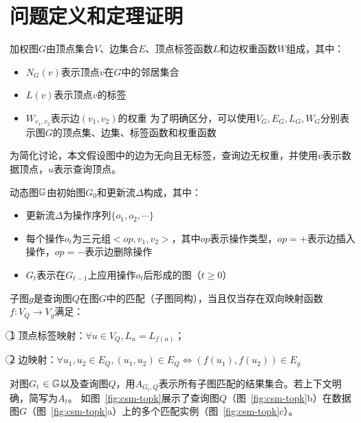 \section{问题定义和定理证明}
\label{ch3:definition}
\begin{definition}[加权图]
    加权图$G$由顶点集合$V$、边集合$E$、顶点标签函数$L$和边权重函数$W$组成，其中：

    \begin{itemize}
    \item $N_G(v)$表示顶点$v$在$G$中的邻居集合
    \item $L(v)$表示顶点$v$的标签
    \item $W_{v_1, v_2}$表示边$(v_1, v_2)$的权重
    为了明确区分，可以使用$V_G, E_G, L_G, W_G$分别表示图$G$的顶点集、边集、标签函数和权重函数
    \end{itemize}  
    \end{definition}
    
    为简化讨论，本文假设图中的边为无向且无标签，查询边无权重，并使用$v$表示数据顶点，$u$表示查询顶点。
    
    \begin{definition}[动态图]\label{def:dynamic-graph}
    动态图$\mathbb{G}$由初始图$G_0$和更新流$\Delta$构成，其中：

    \begin{itemize}
    \item 更新流$\Delta$为操作序列$\{o_1, o_2, \cdots\}$
    \item 每个操作$o_t$为三元组$<op, v_1, v_2>$，其中$op$表示操作类型，$op=+$表示边插入操作，$op=-$表示边删除操作
    \item  $G_t$表示在$G_{t-1}$上应用操作$o_t$后形成的图（$t \geq 0$）    
    \end{itemize} 
    \end{definition}
    
    \begin{definition}[子图匹配]\label{def:subgraph-matching}
    子图$g$是查询图$Q$在图$G$中的匹配（子图同构），当且仅当存在双向映射函数$f: V_Q \rightarrow V_g$满足：
    
    \textcircled{1} 顶点标签映射：$\forall u \in V_Q, L_u = L_{f(u)}$；
    
    \textcircled{2} 边映射：$\forall u_1, u_2\in E_Q, (u_1, u_2) \in E_Q \Leftrightarrow (f(u_1), f(u_2)) \in E_g$
    \end{definition}
    
    对图$G_t$ $\in\mathbb{G}$以及查询图$Q$，用$A_{G_t,Q}$表示所有子图匹配的结果集合。若上下文明确，简写为$A_t$。
    如图~\ref{fig:csm-topk}展示了查询图$Q$（图~\ref{fig:csm-topk}b）在数据图$G$（图~\ref{fig:csm-topk}a）上的多个匹配实例（图~\ref{fig:csm-topk}c）。
    
